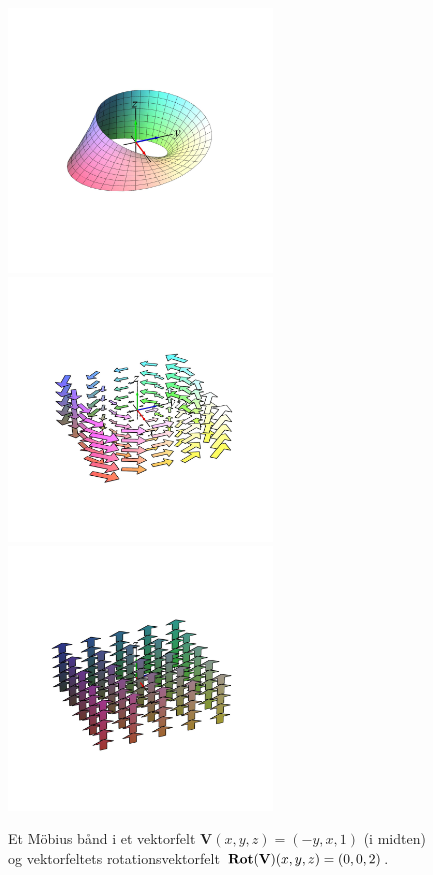\begin{figure}[h]
\centerline{\includegraphics[height=70mm]{FIGS/plotMobius1}\includegraphics[height=70mm]{FIGS/plotMobius2}\includegraphics[height=70mm]{FIGS/plotMobius3}}
\begin{center}
\caption{\small{Et M\"{o}bius bånd i et vektorfelt $\mathbf{V}(x,y,z) = (-y, x, 1)$ (i midten) og  vektorfeltets rotationsvektorfelt  $\operatorname{\mathbf{Rot}}(\mathbf{V})(x,y,z)= (0,0,2)$.}}
\label{figMob1}
\end{center}
\end{figure}



